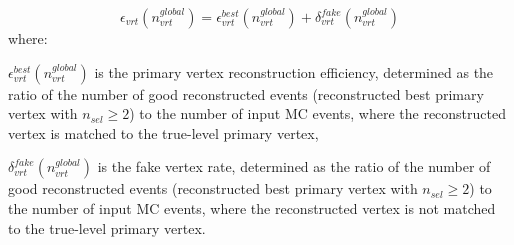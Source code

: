 \begin{equation}
\epsilon_{vrt}\left(n_{vrt}^{global}\right)=\epsilon_{vrt}^ {best}\left(n_{vrt}^{global}\right)+\delta_{vrt}^{fake}\left(n_{vrt}^{global}\right)
\end{equation}
where:
\begin{description}
	\item $\epsilon_{vrt}^ {best}\left(n_{vrt}^{global}\right)$ is the primary vertex reconstruction efficiency, determined as the ratio of the number of good reconstructed events (reconstructed best primary vertex with $n_{sel}\geq 2$) to the number of input MC events, where the reconstructed vertex is matched to the true-level primary vertex,
	\item $\delta_{vrt}^{fake}\left(n_{vrt}^{global}\right)$ is the fake vertex rate, determined as the ratio of the number of good reconstructed events (reconstructed best primary vertex with $n_{sel}\geq 2$) to the number of input MC events, where the reconstructed vertex is not matched to the true-level primary vertex.
\end{description}

